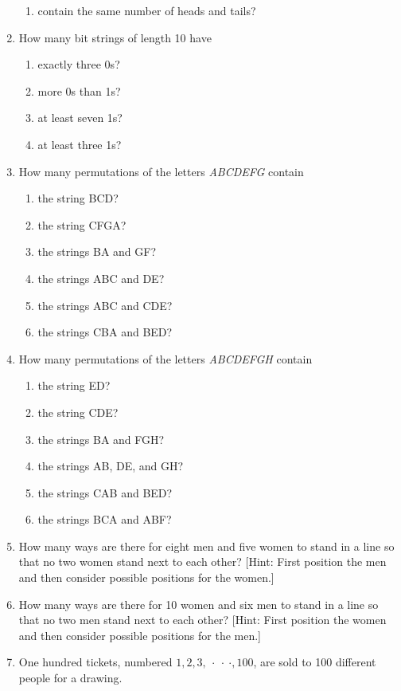 \documentclass[11pt,a4paper]{book}
\begin{document}
\begin{enumerate}
\begin{enumerate}[label=(\alph*)]
\item contain the same number of heads and tails?
\end{enumerate}
\item How many bit strings of length 10 have
\begin{enumerate}[label=(\alph*)]
\item exactly three 0s?
\item more 0s than 1s?
\item at least seven 1s?
\item at least three 1s?
\end{enumerate}
\item How many permutations of the letters \emph{ABCDEFG} contain
\begin{enumerate}[label=(\alph*)]
\item the string BCD?
\item the string CFGA?
\item the strings BA and GF?
\item the strings ABC and DE?
\item the strings ABC and CDE?
\item the strings CBA and BED?
\end{enumerate}
\item How many permutations of the letters \emph{ABCDEFGH} contain
\begin{enumerate}[label=(\alph*)]
\item the string ED?
\item the string CDE?
\item the strings BA and FGH?
\item the strings AB, DE, and GH?
\item the strings CAB and BED?
\item the strings BCA and ABF?
\end{enumerate}
\item How many ways are there for eight men and five women to stand in a line so that no two women stand next to each other? [Hint: First position the men and then consider possible positions for the women.]
\item How many ways are there for 10 women and six men to stand in a line so that no two men stand next to each other? [Hint: First position the women and then consider possible positions for the men.]
\item One hundred tickets, numbered $1, 2, 3, ~\cdot~\cdot~\cdot , 100$, are sold to 100 different people for a drawing.

\end{enumerate}
\end{document}
